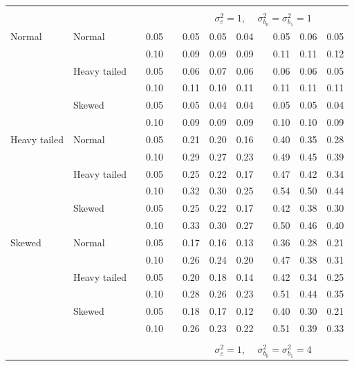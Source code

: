 \documentclass[12pt]{article} %
\begin{document}
\begin{table}[ht]
\begin{scriptsize}
\begin{center}
\begin{tabular}{ll p{.1cm} c p{.1cm} rrr p{.1cm} rrr}
&&&&&&&&&&&\\
& && && \multicolumn{7}{c}{$\sigma_{\varepsilon}^2 = 1$, \ \ $\sigma_{b_0}^2 = \sigma_{b_1}^2 = 1$} \\ \cline{6-12}
Normal       & Normal       && 0.05 &&   0.05 & 0.05 & 0.04 && 0.05 & 0.06 & 0.05 \\ 
             &              && 0.10 &&   0.09 & 0.09 & 0.09 && 0.11 & 0.11 & 0.12 \\ 
             & Heavy tailed && 0.05 &&   0.06 & 0.07 & 0.06 && 0.06 & 0.06 & 0.05 \\ 
             &              && 0.10 &&   0.11 & 0.10 & 0.11 && 0.11 & 0.11 & 0.11 \\ 
             & Skewed       && 0.05 &&   0.05 & 0.04 & 0.04 && 0.05 & 0.05 & 0.04 \\ 
             &              && 0.10 &&   0.09 & 0.09 & 0.09 && 0.10 & 0.10 & 0.09 \\ 
Heavy tailed & Normal       && 0.05 &&   0.21 & 0.20 & 0.16 && 0.40 & 0.35 & 0.28 \\ 
             &              && 0.10 &&   0.29 & 0.27 & 0.23 && 0.49 & 0.45 & 0.39 \\ 
             & Heavy tailed && 0.05 &&   0.25 & 0.22 & 0.17 && 0.47 & 0.42 & 0.34 \\ 
             &              && 0.10 &&   0.32 & 0.30 & 0.25 && 0.54 & 0.50 & 0.44 \\ 
             & Skewed       && 0.05 &&   0.25 & 0.22 & 0.17 && 0.42 & 0.38 & 0.30 \\ 
             &              && 0.10 &&   0.33 & 0.30 & 0.27 && 0.50 & 0.46 & 0.40 \\ 
Skewed       & Normal       && 0.05 &&   0.17 & 0.16 & 0.13 && 0.36 & 0.28 & 0.21 \\ 
             &              && 0.10 &&   0.26 & 0.24 & 0.20 && 0.47 & 0.38 & 0.31 \\ 
             & Heavy tailed && 0.05 &&   0.20 & 0.18 & 0.14 && 0.42 & 0.34 & 0.25 \\ 
             &              && 0.10 &&   0.28 & 0.26 & 0.23 && 0.51 & 0.44 & 0.35 \\ 
             & Skewed       && 0.05 &&   0.18 & 0.17 & 0.12 && 0.40 & 0.30 & 0.21 \\ 
             &              && 0.10 &&   0.26 & 0.23 & 0.22 && 0.51 & 0.39 & 0.33 \\ 

&&&&&&&&&&&\\
& && && \multicolumn{7}{c}{$\sigma_{\varepsilon}^2 = 1$, \ \ $\sigma_{b_0}^2 = \sigma_{b_1}^2 = 4$} \\ \cline{6-12}

\hline
\end{tabular}
\end{center}
\end{scriptsize}
\end{table}
\end{document}
